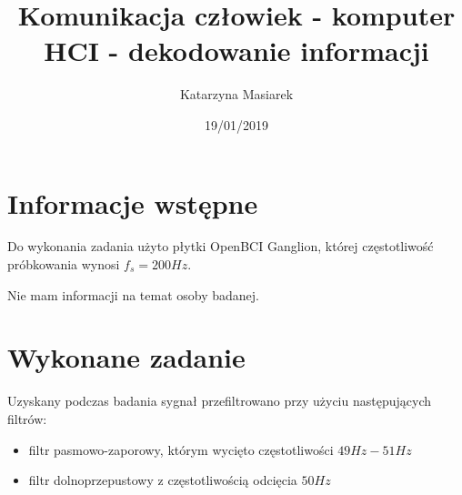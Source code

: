 \documentclass[licencjacka]{kdypl}
\author{Katarzyna Masiarek}
\title{Komunikacja człowiek - komputer\\HCI - dekodowanie informacji}%
\date     {19/01/2019}
\begin{document}






\maketitle



\tableofcontents \thispagestyle{empty}






\newpage

\section{Informacje wstępne}
Do wykonania zadania użyto płytki OpenBCI Ganglion, której częstotliwość próbkowania wynosi $f_s = 200Hz$.

Nie mam informacji na temat osoby badanej.

\section{Wykonane zadanie}
Uzyskany podczas badania sygnał przefiltrowano przy użyciu następujących filtrów:
\begin{itemize}
	\item filtr pasmowo-zaporowy, którym wycięto częstotliwości $49Hz-51Hz$
	\item filtr dolnoprzepustowy z częstotliwością odcięcia $50Hz$
\end{itemize}
\end{document}
